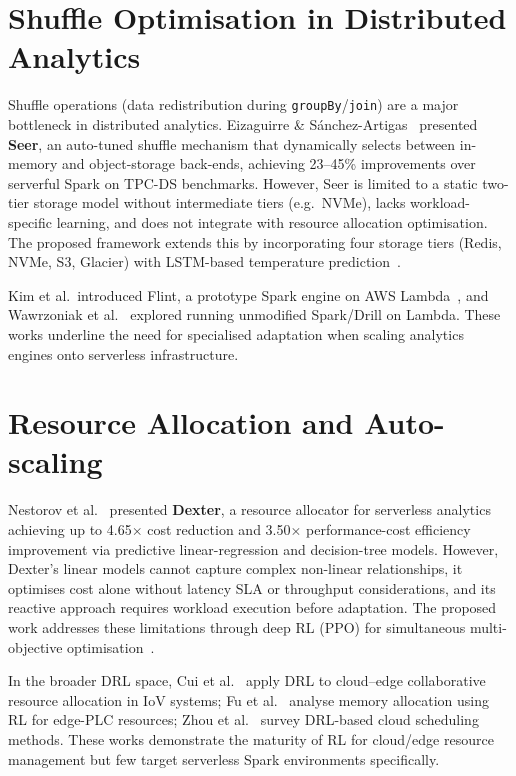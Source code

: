 \section{Shuffle Optimisation in Distributed Analytics}
Shuffle operations (data redistribution during \texttt{groupBy}/\texttt{join}) are a
major bottleneck in distributed analytics. Eizaguirre \&
Sánchez-Artigas~\cite{eizaguirre2022seer} presented \textbf{Seer}, an auto-tuned
shuffle mechanism that dynamically selects between in-memory and object-storage
back-ends, achieving 23--45\% improvements over serverful Spark on TPC-DS benchmarks.
However, Seer is limited to a static two-tier storage model without intermediate tiers
(e.g.\ NVMe), lacks workload-specific learning, and does not integrate with resource
allocation optimisation. The proposed framework extends this by incorporating four
storage tiers (Redis, NVMe, S3, Glacier) with LSTM-based temperature
prediction~\cite{lstm_storage_temp2022}.

Kim et al.\ introduced Flint, a prototype Spark engine on AWS
Lambda~\cite{kim2021function}, and Wawrzoniak et al.~\cite{wawrzoniak2024off} explored
running unmodified Spark/Drill on Lambda. These works underline the need for specialised
adaptation when scaling analytics engines onto serverless infrastructure.

\section{Resource Allocation and Auto-scaling}
Nestorov et al.~\cite{nestorov2024dexter} presented \textbf{Dexter}, a resource
allocator for serverless analytics achieving up to 4.65$\times$ cost reduction and
3.50$\times$ performance-cost efficiency improvement via predictive linear-regression
and decision-tree models. However, Dexter's linear models cannot capture complex
non-linear relationships, it optimises cost alone without latency SLA or throughput
considerations, and its reactive approach requires workload execution before adaptation.
The proposed work addresses these limitations through deep RL (PPO) for simultaneous
multi-objective optimisation~\cite{schulman2017ppo}.

In the broader DRL space, Cui et al.~\cite{cui2023drl} apply DRL to cloud--edge
collaborative resource allocation in IoV systems; Fu et al.~\cite{fu2022distributed}
analyse memory allocation using RL for edge-PLC resources; Zhou et
al.~\cite{zhou2024deep} survey DRL-based cloud scheduling methods. These works
demonstrate the maturity of RL for cloud/edge resource management but few target
serverless Spark environments specifically.

